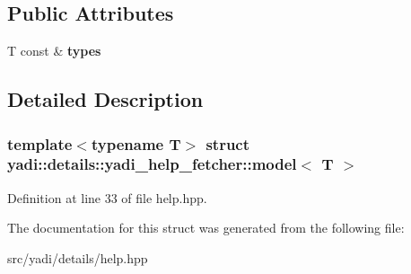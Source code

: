 \subsection*{Public Attributes}
\begin{DoxyCompactItemize}
\item 
\mbox{\label{structyadi_1_1details_1_1yadi__help__fetcher_1_1model_a97e1055826d47be6fff465c2be501173}} 
T const  \& {\bfseries types}
\end{DoxyCompactItemize}


\subsection{Detailed Description}
\subsubsection*{template$<$typename T$>$\newline
struct yadi\+::details\+::yadi\+\_\+help\+\_\+fetcher\+::model$<$ T $>$}



Definition at line 33 of file help.\+hpp.



The documentation for this struct was generated from the following file\+:\begin{DoxyCompactItemize}
\item 
src/yadi/details/help.\+hpp\end{DoxyCompactItemize}
